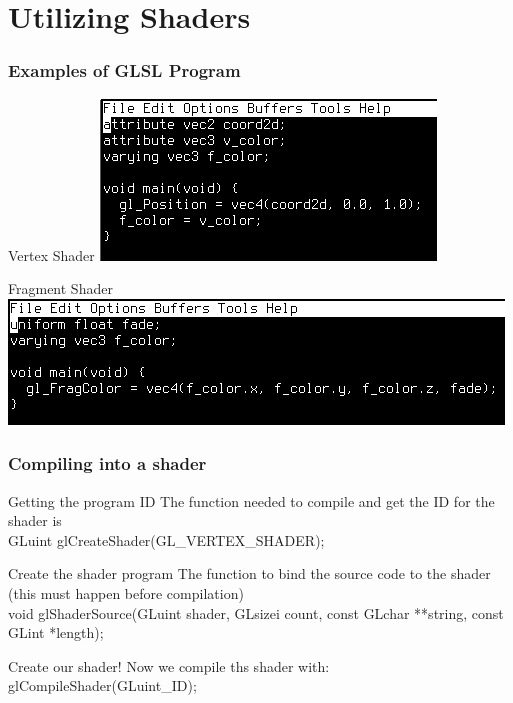 \documentclass{beamer}
\begin{document}
\section{Utilizing Shaders}

\begin{frame}

  \frametitle{Examples of GLSL Program}
  \begin{block}{Vertex Shader}
    \includegraphics[scale=.4]{vert_shader.png}
  \end{block}
  \begin{block}{Fragment Shader}
    \includegraphics[scale=.4]{frag_shader.png}
  \end{block}
\end{frame}

\begin{frame}

  \frametitle{Compiling into a shader}

  \begin{block}{Getting the program ID}
    The function needed to compile and get the ID for the shader is\\
    GLuint glCreateShader(GL\_VERTEX\_SHADER);
  \end{block}

  \begin{block}{Create the shader program}
    The function to bind the source code to the shader (this must happen before compilation)\\
    void glShaderSource(GLuint shader,
    GLsizei count,
    const GLchar **string,
    const GLint *length);
  \end{block}

  \begin{block}{Create our shader!}
    Now we compile ths shader with:\\
    glCompileShader(GLuint\_ID);
  \end{block}

\end{frame}
\end{document}
